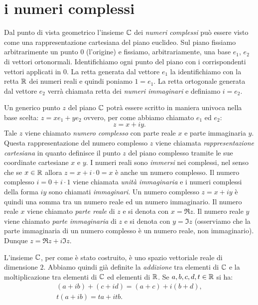 \section{i numeri complessi}
%
%
%
\label{sec:complessi}

Dal punto di vista geometrico l'insieme $\CC$ dei \emph{numeri complessi}%
%
\index{$\CC$}
può essere visto come una rappresentazione cartesiana 
del piano euclideo.
Sul piano fissiamo arbitrarimente un punto $0$ (l'origine) 
e fissiamo, arbitrariamente, una base $e_1$, $e_2$ di vettori ortonormali.
Identifichiamo ogni punto del piano con i corrispondenti vettori
applicati in $0$. La retta generata dal vettore $e_1$ la identifichiamo
con la retta ${\mathbb R}$ dei numeri reali e quindi poniamo $1=e_1$.
La retta ortogonale generata dal vettore $e_2$ verrà chiamata
retta dei \emph{numeri immaginari} e definiamo $i=e_2$.

Un generico punto $z$ del piano $\CC$ potrà essere scritto in
maniera univoca nella base scelta: $z = x e_1 + y e_2$ ovvero,
per come abbiamo chiamato $e_1$ ed $e_2$:
\[
z = x + i y.
\]
Tale $z$ viene chiamato
\emph{numero complesso} con parte reale $x$ e parte immaginaria $y$.
Questa rappresentazione del numero complesso $z$ viene
chiamata \emph{rappresentazione cartesiana}%
%
 in quanto definisce
il punto $z$ del piano complesso tramite le sue coordinate cartesiane
$x$ e $y$.
I numeri reali sono \emph{immersi} nei complessi, nel senso che se
$x\in {\mathbb R}$ allora $z= x + i\cdot 0 = x$ è anche un numero complesso.
Il numero complesso $i = 0 + i\cdot 1$ viene chiamata \emph{unità immaginaria}%
%
e i numeri complessi della forma $iy$ sono chiamati \emph{immaginari}.
Un numero
complesso $z = x+iy$ è quindi una somma tra un numero reale ed un numero
immaginario. Il numero reale $x$ viene chiamato \emph{parte reale}
di $z$ e
si denota con $x=\Re z$.
%
Il numero reale $y$ viene chiamato
\emph{parte immaginaria}
di $z$ e si denota con $y=\Im z$
%
(osserviamo che la parte immaginaria di un numero complesso è un numero
reale, non immaginario). Dunque $z= \Re z + i \Im z$.

L'insieme $\CC$, per come
è stato costruito, è uno spazio vettoriale reale di dimensione $2$.
Abbiamo quindi già definite la \emph{addizione}%
%
tra elementi di $\CC$ e la moltiplicazione
tra elementi di $\CC$ ed elementi di ${\mathbb R}$.
Se $a,b,c,d,t\in {\mathbb R}$ si ha:
\begin{gather*}
 (a+ib) + (c+id) = (a+c) + i (b+d), \\
 t(a+ib) = ta + itb.
\end{gather*}

